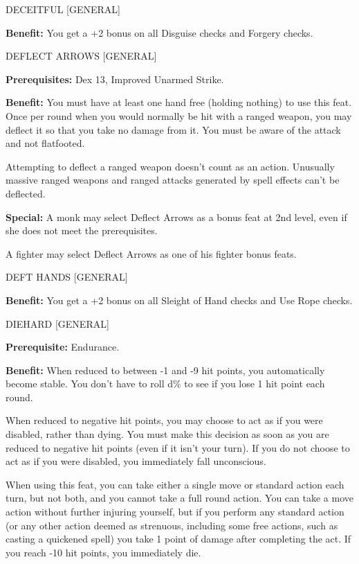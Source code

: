 \documentclass{article}
\begin{document}
\vspace{12pt}
DECEITFUL [GENERAL]

\textbf{Benefit:} You get a +2 bonus on all Disguise checks and Forgery checks.

\vspace{12pt}
DEFLECT ARROWS [GENERAL]

\textbf{Prerequisites:} Dex 13, Improved Unarmed Strike.

\textbf{Benefit:} You must have at least one hand free (holding nothing) to use 
this feat. Once per round when you would normally be hit with a ranged weapon, 
you may deflect it so that you take no damage from it. You must be aware of the 
attack and not flatfooted.

Attempting to deflect a ranged weapon doesn't count as an action. Unusually massive 
ranged weapons and ranged attacks generated by spell effects can't be deflected.

\textbf{Special:} A monk may select Deflect Arrows as a bonus feat at 2nd level, 
even if she does not meet the prerequisites.

A fighter may select Deflect Arrows as one of his fighter bonus feats.

\vspace{12pt}
DEFT HANDS [GENERAL]

\textbf{Benefit:} You get a +2 bonus on all Sleight of Hand checks and Use Rope 
checks.

\vspace{12pt}
DIEHARD [GENERAL]

\textbf{Prerequisite:} Endurance.

\textbf{Benefit:} When reduced to between -1 and -9 hit points, you automatically 
become stable. You don't have to roll d\% to see if you lose 1 hit point each round.

When reduced to negative hit points, you may choose to act as if you were disabled, 
rather than dying. You must make this decision as soon as you are reduced to negative 
hit points (even if it isn't your turn). If you do not choose to act as if you 
were disabled, you immediately fall unconscious.

When using this feat, you can take either a single move or standard action each 
turn, but not both, and you cannot take a full round action. You can take a move 
action without further injuring yourself, but if you perform any standard action 
(or any other action deemed as strenuous, including some free actions, such as 
casting a quickened spell) you take 1 point of damage after completing the act. 
If you reach -10 hit points, you immediately die.
\end{document}
